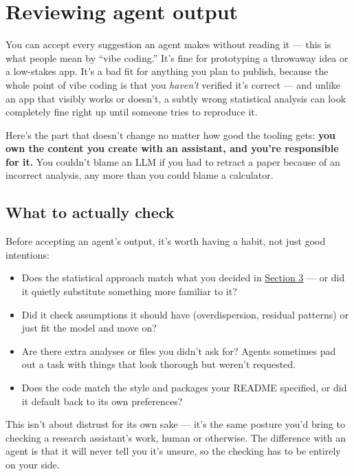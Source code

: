\documentclass[
  letterpaper,
  DIV=11,
  numbers=noendperiod]{scrreprt}
\providecommand{\tightlist}{%
  \setlength{\itemsep}{0pt}\setlength{\parskip}{0pt}}
\begin{document}
\chapter{Reviewing agent output}\label{reviewing-agent-output}

You can accept every suggestion an agent makes without reading it ---
this is what people mean by ``vibe coding.'' It's fine for prototyping a
throwaway idea or a low-stakes app. It's a bad fit for anything you plan
to publish, because the whole point of vibe coding is that you
\emph{haven't} verified it's correct --- and unlike an app that visibly
works or doesn't, a subtly wrong statistical analysis can look
completely fine right up until someone tries to reproduce it.

Here's the part that doesn't change no matter how good the tooling gets:
\textbf{you own the content you create with an assistant, and you're
responsible for it.} You couldn't blame an LLM if you had to retract a
paper because of an incorrect analysis, any more than you could blame a
calculator.

\section{What to actually check}\label{what-to-actually-check}

Before accepting an agent's output, it's worth having a habit, not just
good intentions:

\begin{itemize}
\tightlist
\item
  Does the statistical approach match what you decided in
  \href{../section-3-workflows/01-select-statistical-approach.qmd}{Section
  3} --- or did it quietly substitute something more familiar to it?
\item
  Did it check assumptions it should have (overdispersion, residual
  patterns) or just fit the model and move on?
\item
  Are there extra analyses or files you didn't ask for? Agents sometimes
  pad out a task with things that look thorough but weren't requested.
\item
  Does the code match the style and packages your README specified, or
  did it default back to its own preferences?
\end{itemize}

This isn't about distrust for its own sake --- it's the same posture
you'd bring to checking a research assistant's work, human or otherwise.
The difference with an agent is that it will never tell you it's unsure,
so the checking has to be entirely on your side.
\end{document}
